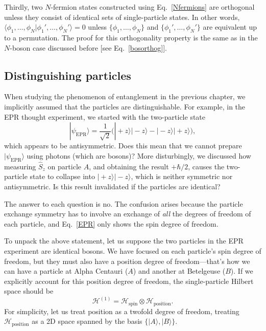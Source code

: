 \documentclass[pra,12pt]{revtex4-2}
\begin{document}
Thirdly, two $N$-fermion states constructed using
Eq.~\eqref{Nfermions} are orthogonal unless they consist of identical
sets of single-particle states.  In other words, $\langle \phi_1,
\dots, \phi_N| \phi_1', \dots, \phi_N'\rangle = 0$ unless $\{\phi_1,
\dots, \phi_N\}$ and $\{\phi_1', \dots, \phi_N'\}$ are equivalent up
to a permutation.  The proof for this orthogonality property is the
same as in the $N$-boson case discussed before [see
  Eq.~\eqref{bosorthog}].

\subsection{Distinguishing particles}

When studying the phenomenon of entanglement in the previous chapter,
we implicitly assumed that the particles are distinguishable.  For
example, in the EPR thought experiment, we started with the
two-particle state
\begin{equation}
  |\psi_{\mathrm{EPR}}\rangle = \frac{1}{\sqrt{2}} \Big(|\!+\!z\rangle |\!-\!z\rangle
  - |\!-\!z\rangle |\!+\!z\rangle \Big),
  \label{EPR}
\end{equation}
which appears to be antisymmetric.  Does this mean that we cannot
prepare $|\psi_{\mathrm{EPR}}\rangle$ using photons (which are
bosons)?  More disturbingly, we discussed how measuring $\hat{S}_z$ on
particle $A$, and obtaining the result $+\hbar/2$, causes the
two-particle state to collapse into $|\!+\!z\rangle |\!-\!z\rangle$,
which is neither symmetric nor antisymmetric.  Is this result
invalidated if the particles are identical?

The answer to each question is no.  The confusion arises because the
particle exchange symmetry has to involve an exchange of \textit{all}
the degrees of freedom of each particle, and Eq.~\eqref{EPR} only
shows the spin degree of freedom.

To unpack the above statement, let us suppose the two particles in the
EPR experiment are identical bosons.  We have focused on each
particle's spin degree of freedom, but they must also have a position
degree of freedom---that's how we can have a particle at Alpha
Centauri ($A$) and another at Betelgeuse ($B$).  If we explicitly
account for this position degree of freedom, the single-particle
Hilbert space should be
\begin{equation}
  \mathscr{H}^{(1)} = \mathscr{H}_{\mathrm{spin}} \otimes \mathscr{H}_{\mathrm{position}}.
\end{equation}
For simplicity, let us treat position as a twofold degree of freedom,
treating $\mathscr{H}_{\mathrm{position}}$ as a 2D space spanned by
the basis $\{|A\rangle, |B\rangle\}$.
\end{document}

